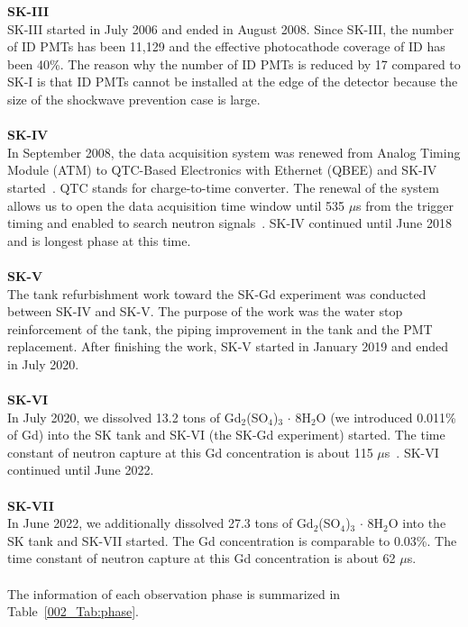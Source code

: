 \textbf{SK-III}\\
\hs SK-III started in July 2006 and ended in August 2008.
Since SK-III, the number of ID PMTs has been 11,129 and the effective photocathode coverage of ID has been 40\%.
The reason why the number of ID PMTs is reduced by 17 compared to SK-I is that ID PMTs cannot be installed at the edge of the detector because the size of the shockwave prevention case is large.\\
\\
\textbf{SK-IV}\\
\hs In September 2008, the data acquisition system was renewed from Analog Timing Module (ATM) to QTC-Based Electronics with Ethernet (QBEE) and SK-IV started~\cite{2009Nishino}.
QTC stands for charge-to-time converter.
The renewal of the system allows us to open the data acquisition time window until 535 $\mu$s from the trigger timing and enabled to search neutron signals~\cite{2009Watanabe}.
SK-IV continued until June 2018 and is longest phase at this time.\\
\\
\textbf{SK-V}\\
\hs The tank refurbishment work toward the SK-Gd experiment was conducted between SK-IV and SK-V.
The purpose of the work was the water stop reinforcement of the tank, the piping improvement in the tank and the PMT replacement.
After finishing the work, SK-V started in January 2019 and ended in July 2020.\\
\\
\textbf{SK-VI}\\
\hs In July 2020, we dissolved 13.2 tons of Gd$_{\text{2}}$(SO$_{\text{4}}$)$_{\text{3}}\,\cdot\,$8H$_{\text{2}}$O (we introduced 0.011\% of Gd) into the SK tank and SK-VI (the SK-Gd experiment) started.
The time constant of neutron capture at this Gd concentration is about 115 $\mu$s~\cite{2022Abe}.
SK-VI continued until June 2022.\\
\\
\textbf{SK-VII}\\
\hs In June 2022, we additionally dissolved 27.3 tons of Gd$_{\text{2}}$(SO$_{\text{4}}$)$_{\text{3}}\,\cdot\,$8H$_{\text{2}}$O into the SK tank and SK-VII started.
The Gd concentration is comparable to 0.03\%.
The time constant of neutron capture at this Gd concentration is about 62 $\mu$s.\\
\\
\hs The information of each observation phase is summarized in Table~\ref{002_Tab:phase}.

